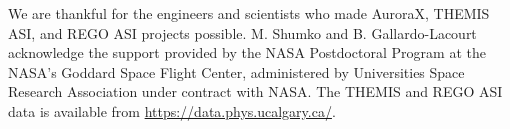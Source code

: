 \documentclass[draft]{agujournal2019}
\begin{document}
\acknowledgments
We are thankful for the engineers and scientists who made AuroraX, THEMIS ASI, and REGO ASI projects possible. M. Shumko and B. Gallardo-Lacourt acknowledge the support provided by the NASA Postdoctoral Program at the NASA’s Goddard Space Flight Center, administered by Universities Space Research Association under contract with NASA. The THEMIS and REGO ASI data is available from \url{https://data.phys.ucalgary.ca/}.

% 
\end{document}
